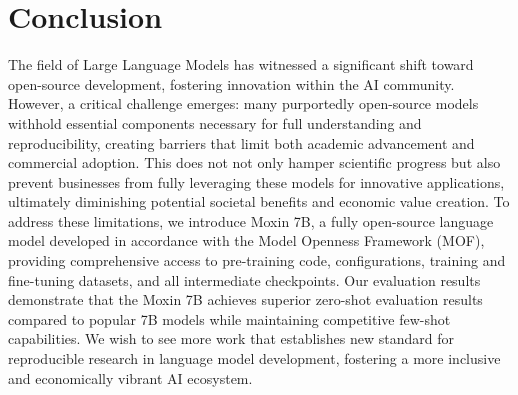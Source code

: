 \section{Conclusion}\label{sec5.conclusion}


The field of Large Language Models has witnessed a significant shift toward open-source development, fostering innovation within the AI community. However, a critical challenge emerges: many purportedly open-source models withhold essential components necessary for full understanding and reproducibility, creating barriers that limit both academic advancement and commercial adoption. This does not not only hamper scientific progress but also prevent businesses from fully leveraging these models for innovative applications, ultimately diminishing potential societal benefits and economic value creation.
To address these limitations, we introduce Moxin 7B, a fully open-source language model developed in accordance with the Model Openness Framework (MOF), providing comprehensive access to pre-training code, configurations, training and fine-tuning datasets, and all intermediate checkpoints. Our evaluation results demonstrate that the Moxin 7B achieves superior zero-shot evaluation results compared to popular 7B models while maintaining competitive few-shot capabilities. We wish to see more work that establishes new standard for reproducible research in language model development, fostering a more inclusive and economically vibrant AI ecosystem.